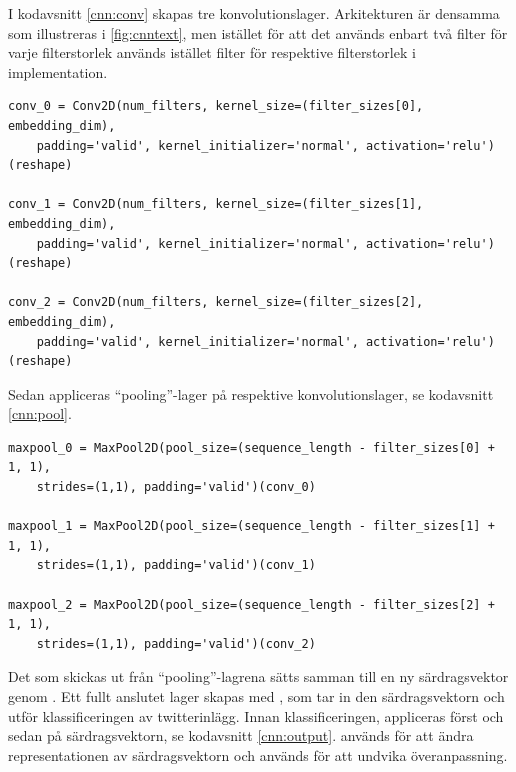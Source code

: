 \documentclass{kaumasters} %
\begin{document}
I kodavsnitt \ref{cnn:conv} skapas tre konvolutionslager. Arkitekturen är densamma som illustreras i \ref{fig:cnntext}, men istället för att det används enbart två filter för varje filterstorlek används istället  filter för respektive filterstorlek i implementation.

\begin{lstlisting}[style=mypython,caption={Kod för att skapa konvulsionslager.},label=cnn:conv]
conv_0 = Conv2D(num_filters, kernel_size=(filter_sizes[0], embedding_dim), 
    padding='valid', kernel_initializer='normal', activation='relu')(reshape)
	
conv_1 = Conv2D(num_filters, kernel_size=(filter_sizes[1], embedding_dim), 
    padding='valid', kernel_initializer='normal', activation='relu')(reshape)
	
conv_2 = Conv2D(num_filters, kernel_size=(filter_sizes[2], embedding_dim), 
    padding='valid', kernel_initializer='normal', activation='relu')(reshape)
\end{lstlisting}

Sedan appliceras “pooling”-lager på respektive konvolutionslager, se kodavsnitt \ref{cnn:pool}. 

\begin{lstlisting}[style=mypython,caption={Kod för att skapa och applicera ''pooling''-lager på respektive konvolutionslager.},label=cnn:pool]
maxpool_0 = MaxPool2D(pool_size=(sequence_length - filter_sizes[0] + 1, 1),
    strides=(1,1), padding='valid')(conv_0)
	
maxpool_1 = MaxPool2D(pool_size=(sequence_length - filter_sizes[1] + 1, 1), 
    strides=(1,1), padding='valid')(conv_1)
	
maxpool_2 = MaxPool2D(pool_size=(sequence_length - filter_sizes[2] + 1, 1), 
    strides=(1,1), padding='valid')(conv_2)
\end{lstlisting}

Det som skickas ut från “pooling”-lagrena sätts samman till en ny särdragsvektor genom . Ett fullt anslutet lager skapas med  \cite{impcnn:006}, som tar in den särdragsvektorn och utför klassificeringen av twitterinlägg. Innan klassificeringen, appliceras först  \cite{impcnn:006} och sedan  \cite{impcnn:006} på särdragsvektorn, se kodavsnitt \ref{cnn:output}.  används för att ändra representationen av särdragsvektorn och  används för att undvika överanpassning. 
\end{document}
